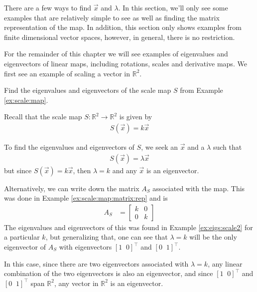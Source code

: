 There are a few ways to find $\vec{x}$ and $\lambda$.  In this section, we'll only see some examples that are relatively simple to see as well as finding the matrix representation of the map.  In addition, this section only shows examples from finite dimensional vector spaces, however, in general, there is no restriction.  

For the remainder of this chapter we will see examples of eigenvalues and eigenvectors of linear maps, including rotations, scales and derivative maps.  We first see an example of scaling a vector in $\mathbb{R}^2$.  

\begin{example}

Find the eigenvalues and eigenvectors of the scale map $S$ from Example \ref{ex:scale:map}.  

\solution

Recall that the scale map $S: \mathbb{R}^2 \rightarrow \mathbb{R}^2$ is given by 
%
\begin{align*}
S(\vec{x}) = k \vec{x}
\end{align*}

To find the eigenvalues and eigenvectors of $S$, we seek an $\vec{x}$ and a $\lambda$ such that 
%
\begin{align*}
S(\vec{x})=\lambda \vec{x}
\end{align*}
but since $S(\vec{x})=k \vec{x}$, then $\lambda =k$ and any $\vec{x}$ is an eigenvector.  

Alternatively, we can write down the matrix $A_S$ associated with the map.  This was done in Example \ref{ex:scale:map:matrix:rep} and is
%
\begin{align*}
A_S & = \begin{bmatrix}
k & 0 \\ 0 & k 
\end{bmatrix}
\end{align*}
The eigenvalues and eigenvectors of this was found in Example \ref{ex:eigs:scale2} for a particular $k$, but generalizing that, one can see that $\lambda=k$ will be the only eigenvector of $A_S$ with eigenvectors $[1\;\;0]^{\intercal}$ and $[0\;\;1]^{\intercal}$.  

In this case, since there are two eigenvectors associated with $\lambda=k$, any linear combination of the two eigenvectors is also an eigenvector, and since $[1\;\;0]^{\intercal}$ and $[0\;\;1]^{\intercal}$ span $\mathbb{R}^2$, any vector in $\mathbb{R}^2$ is an eigenvector.  
\end{example}

